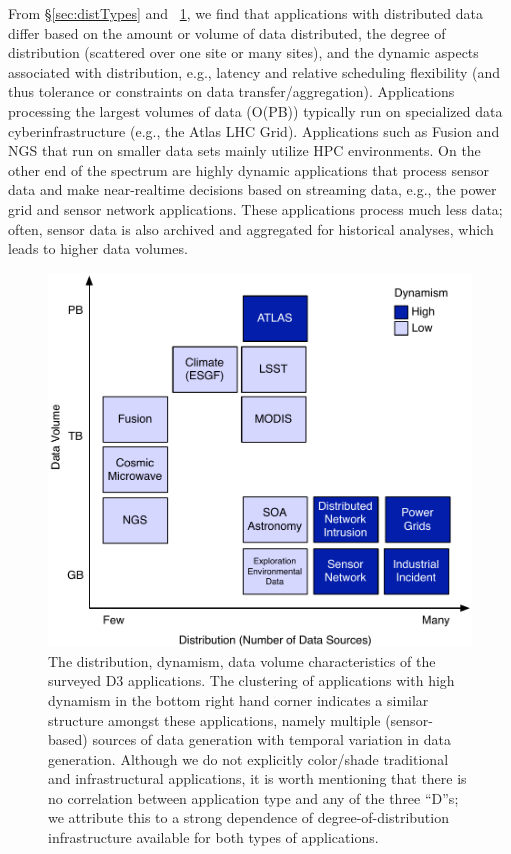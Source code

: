 From \S\ref{sec:distTypes} and
\figurename~\ref{fig:figures_application}, we find that applications
with distributed data differ based on the amount or volume of data
distributed, the degree of distribution (scattered over one site or
many sites), and the dynamic aspects associated with distribution,
e.g., latency and relative scheduling flexibility (and thus tolerance
or constraints on data transfer/aggregation).  Applications processing
the largest volumes of data (O(PB)) typically run on specialized data
cyberinfrastructure (e.g., the Atlas LHC Grid). Applications such as
Fusion and NGS that run on smaller data sets mainly utilize HPC
environments. On the other end of the spectrum are highly dynamic
applications that process sensor data and make near-realtime
decisions based on streaming data, e.g., the power grid and sensor
network applications. These applications process much less data;
often, sensor data is also archived and aggregated for historical
analyses, which leads to higher data volumes. %

\begin{figure}[ht]
	\centering
		\includegraphics[width=.7\textwidth]{figures/application.pdf}
                \caption{The distribution, dynamism, data volume
                  characteristics of the surveyed D3 applications. The
                  clustering of applications with high dynamism in the
                  bottom right hand corner indicates a similar
                  structure amongst these applications, namely
                  multiple (sensor-based) sources of data
                  generation with temporal variation in data
                  generation. Although we do not explicitly
                  color/shade traditional and infrastructural
                  applications, it is worth mentioning that there is
                  no correlation between application type and any of
                  the three ``D''s; we attribute this to a strong
                  dependence of degree-of-distribution infrastructure
                  available for both types of applications.
                  \label{fig:figures_application}}
\end{figure}

